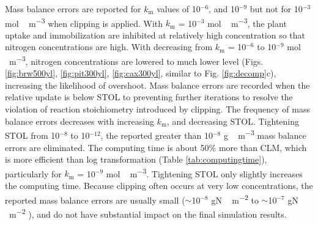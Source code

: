 \documentclass[gmd, manuscript]{copernicus}
\begin{document}
Mass balance errors are reported for $k_\text{m}$ values of 10$^{-6}$, and
10$^{-9}$ but not for 10$^{-3}$ \unit{mol\,m^{-3}} when clipping is applied.
With $k_\text{m}$ = 10$^{-3}$ \unit{mol\,m^{-3}}, the plant uptake and
immobilization are inhibited at relatively high concentration so that nitrogen
concentrations are high. With decreasing from $k_\text{m}$ = 10$^{-6}$ to
10$^{-9}$ \unit{mol\,m^{-3}}, nitrogen concentrations are lowered to much lower
level (Figs. \ref{fig:brw500yl}, \ref{fig:pit300yl}, \ref{fig:cax300yl},
similar to Fig. \ref{fig:decomp}c), increasing the likelihood of overshoot.
Mass balance errors are recorded when the relative update is below STOL to
preventing further iterations to resolve the violation of reaction
stoichiometry introduced by clipping. The frequency of mass balance errors
decreases with increasing $k_\text{m}$, and decreasing STOL. Tightening STOL
from 10$^{-8}$ to 10$^{-12}$, the reported greater than 10$^{-8}$
\unit{g\,m^{-3}} mass balance errors are eliminated. The computing time is
about 50\% more than CLM, which is more efficient than log transformation
(Table \ref{tab:computingtime}), particularly for $k_\text{m}$ = 10$^{-9}$
\unit{mol\,m^{-3}}. Tightening STOL only slightly increases the computing time. 
Because clipping often occurs at very low concentrations, the reported mass
balance errors are usually small ($\sim$10$^{-8}$  \unit{gN\,m^{-2}} to
$\sim$10$^{-7}$  \unit{gN\,m^{-2}} ), and do not have substantial impact
on the final simulation results. 
\end{document}
